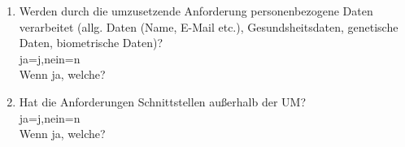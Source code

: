 \begin{Form}
\begin{enumerate}
	\item Werden durch die umzusetzende Anforderung personenbezogene Daten verarbeitet (allg. Daten (Name, E-Mail etc.), Gesundsheitsdaten, genetische Daten, biometrische Daten)? \\ \ChoiceMenu[radio, radiosymbol=6 default=n, width=0.5cm, name=persodata]{} {ja=j,nein=n} \\
	Wenn ja, welche? \\
	\TextField[multiline, name=jpersodata,width=0.9\textwidth,  height=2cm, value={}]{}
	
	\item Hat die Anforderungen Schnittstellen außerhalb der UM? \\ \ChoiceMenu[radio, radiosymbol=6 default=n, width=0.5cm, name=outum]{} {ja=j,nein=n} \\
	Wenn ja, welche? \\
	\TextField[multiline, name=joutum,width=0.9\textwidth,  height=2cm, value={}]{}

  \end{enumerate}
\end{Form}